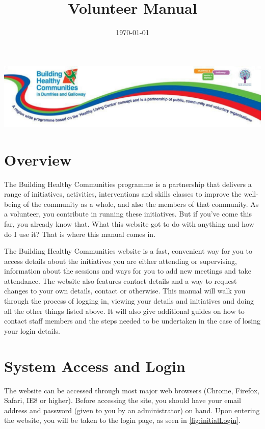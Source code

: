 \documentclass{bhcguides}
\begin{document}
\title{Volunteer Manual}
\includegraphics[width=1.0\textwidth]{BHCbanner.png}
\date{\today}
\maketitle

\tableofcontents

\pagebreak

\section{Overview}

The Building Healthy Communities programme is a partnership that delivers a range of initiatives, activities, interventions and skills classes to improve the well-being of the community as a whole, and also the members of that community. As a volunteer, you contribute in running these initiatives. But if you've come this far, you already know that. What this website got to do with anything and how do I use it? That is where this manual comes in.

The Building Healthy Communities website is a fast, convenient way for you to access details about the initiatives you are either attending or supervising, information about the sessions and ways for you to add new meetings and take attendance. The website also features contact details and a way to request changes to your own details, contact or otherwise. This manual will walk you through the process of logging in, viewing your details and initiatives and doing all the other things listed above. It will also give additional guides on how to contact staff members and the steps needed to be undertaken in the case of losing your login details.


\section{System Access and Login}
\label{sec:syslogin}

The website can be accessed through most major web browsers (Chrome, Firefox, Safari, IE8 or higher). Before accessing the site, you should have your email address and password (given to you by an administrator) on hand. Upon entering the website, you will be taken to the login page, as seen in \autoref{fig:initialLogin}.
\end{document}
